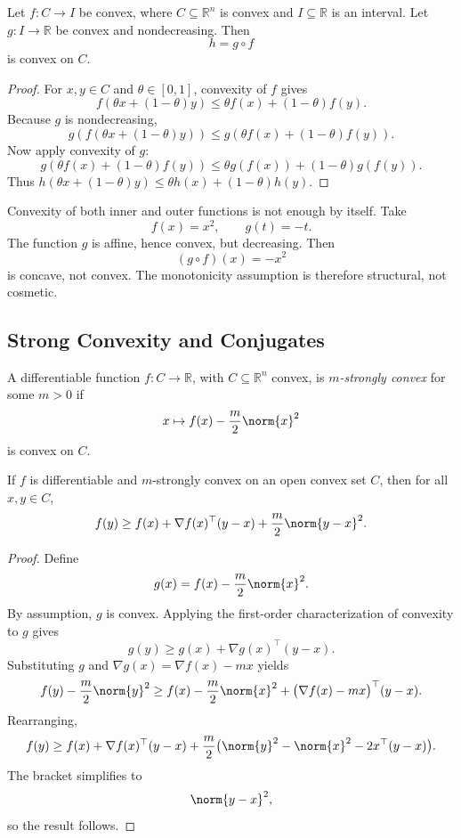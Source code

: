 \begin{proposition}\label{prop:l1-scalar-composition-rule}
	Let $f:C \to I$ be convex, where $C \subseteq \mathbb{R}^n$ is convex and $I \subseteq \mathbb{R}$ is an interval. Let $g:I \to \mathbb{R}$ be convex and nondecreasing. Then
	\[
		h = g \circ f
	\]
	is convex on $C$.
\end{proposition}
\begin{proof}
	For $x,y \in C$ and $\theta \in [0,1]$, convexity of $f$ gives
	\[
		f(\theta x+(1-\theta)y)
		\le \theta f(x)+(1-\theta)f(y).
	\]
	Because $g$ is nondecreasing,
	\[
		g(f(\theta x+(1-\theta)y))
		\le g(\theta f(x)+(1-\theta)f(y)).
	\]
	Now apply convexity of $g$:
	\[
		g(\theta f(x)+(1-\theta)f(y))
		\le \theta g(f(x))+(1-\theta)g(f(y)).
	\]
	Thus $h(\theta x+(1-\theta)y)\le \theta h(x)+(1-\theta)h(y)$.
\end{proof}

\begin{remark}
	Convexity of both inner and outer functions is not enough by itself. Take
	\[
		f(x)=x^2,
		\qquad
		g(t)=-t.
	\]
	The function $g$ is affine, hence convex, but decreasing. Then
	\[
		(g\circ f)(x) = -x^2
	\]
	is concave, not convex. The monotonicity assumption is therefore structural, not cosmetic.
\end{remark}

\subsection{Strong Convexity and Conjugates}
\label{sec:l1-strong-convexity-and-conjugates}

\begin{definition}\label{def:l1-strong-convexity}
	A differentiable function $f:C \to \mathbb{R}$, with $C \subseteq \mathbb{R}^n$ convex, is \emph{$m$-strongly convex} for some $m>0$ if
	\[
		x \mapsto f(x)-\frac{m}{2}\norm{x}^2
	\]
	is convex on $C$.
\end{definition}

\begin{theorem}\label{thm:l1-strong-convexity-lower-bound}
	If $f$ is differentiable and $m$-strongly convex on an open convex set $C$, then for all $x,y \in C$,
	\[
		f(y) \ge f(x) + \nabla f(x)^\top (y-x) + \frac{m}{2}\norm{y-x}^2.
	\]
\end{theorem}
\begin{proof}
	Define
	\[
		g(x)=f(x)-\frac{m}{2}\norm{x}^2.
	\]
	By assumption, $g$ is convex. Applying the first-order characterization of convexity to $g$ gives
	\[
		g(y)\ge g(x)+\nabla g(x)^\top(y-x).
	\]
	Substituting $g$ and $\nabla g(x)=\nabla f(x)-mx$ yields
	\[
		f(y)-\frac{m}{2}\norm{y}^2
		\ge
		f(x)-\frac{m}{2}\norm{x}^2
		+\bigl(\nabla f(x)-mx\bigr)^\top(y-x).
	\]
	Rearranging,
	\[
		f(y)\ge f(x)+\nabla f(x)^\top(y-x)
		+\frac{m}{2}\bigl(\norm{y}^2-\norm{x}^2-2x^\top(y-x)\bigr).
	\]
	The bracket simplifies to
	\[
		\norm{y-x}^2,
	\]
	so the result follows.
\end{proof}


